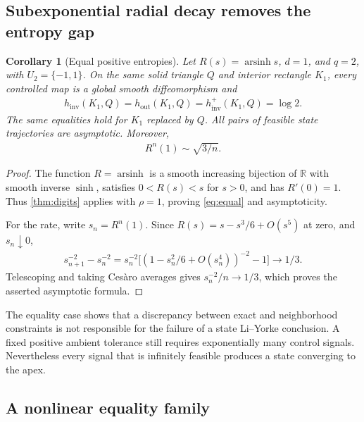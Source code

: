\documentclass[11pt,a4paper]{article}
\newtheorem{corollary}[theorem]{Corollary}
\theoremstyle{definition}
\theoremstyle{remark}
\begin{document}
\subsection{Subexponential radial decay removes the entropy gap}

\begin{corollary}[Equal positive entropies]\label{cor:equal}
Let \(R(s)=\operatorname{arsinh}s\), \(d=1\), and \(q=2\), with \(U_2=\{-1,1\}\). On the same solid triangle \(Q\) and interior rectangle \(K_1\), every controlled map is a global smooth diffeomorphism and
\begin{align}\label{eq:equal}
 h_{\mathrm{inv}}(K_1,Q)=h_{\mathrm{out}}(K_1,Q)=h_{\mathrm{inv}}^{+}(K_1,Q)=\log2.
\end{align}
The same equalities hold for \(K_1\) replaced by \(Q\). All pairs of feasible state trajectories are asymptotic. Moreover,
\begin{align*}
 R^n(1)\sim\sqrt{3/n}.
\end{align*}
\end{corollary}
\begin{proof}
The function \(R=\operatorname{arsinh}\) is a smooth increasing bijection of \(\mathbb R\) with smooth inverse \(\sinh\), satisfies \(0<R(s)<s\) for \(s>0\), and has \(R'(0)=1\). Thus \cref{thm:digits} applies with \(\rho=1\), proving \eqref{eq:equal} and asymptoticity.

For the rate, write \(s_n=R^n(1)\). Since
\(R(s)=s-s^3/6+O(s^5)\) at zero, and \(s_n\downarrow0\),
\begin{align*}
 s_{n+1}^{-2}-s_n^{-2}
 =s_n^{-2}\bigl[(1-s_n^2/6+O(s_n^4))^{-2}-1\bigr]
 \longrightarrow1/3.
\end{align*}
Telescoping and taking Ces\`aro averages gives \(s_n^{-2}/n\to1/3\), which proves the asserted asymptotic formula.
\end{proof}

The equality case shows that a discrepancy between exact and neighborhood constraints is not responsible for the failure of a state Li--Yorke conclusion. A fixed positive ambient tolerance still requires exponentially many control signals. Nevertheless every signal that is infinitely feasible produces a state converging to the apex.

\subsection{A nonlinear equality family}\label{sec:joint-proof}
\end{document}
